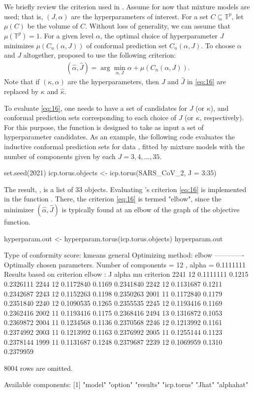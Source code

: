 We briefly review the criterion used in \citet{Jung:2021}. Assume for now that mixture models are used; that is, $(J, \alpha)$ are the hyperparameters of interest.  For a set $C\subseteq\mathbb{T}^p$, let $\mu(C)$ be the volume of $C$. Without loss of generality, we can assume that $\mu\left(\mathbb{T}^p\right)=1$. For a given level $\alpha$, the optimal choice of hyperparameter $J$ minimizes $\mu\left(C_n(\alpha,J)\right)$ of conformal prediction set $C_n\left(\alpha, J\right)$. To choose $\alpha$ and $J$ altogether, \citet{Jung:2021} proposed to use the following criterion:
\begin{align}\label{eq:16}
\left(\hat{\alpha},\hat{J}\right) = \arg\min_{\alpha, J}\alpha + \mu\left(C_n\left(\alpha, J\right)\right).
\end{align}
Note that if $(\kappa, \alpha)$ are the hyperparameters, then $J$ and $\hat{J}$ in  \eqref{eq:16} are replaced by $\kappa$ and $\hat\kappa$. 

 To evaluate \eqref{eq:16}, one needs to have a set of candidates for $J$ (or $\kappa$), and conformal prediction sets corresponding to each choice of $J$ (or $\kappa$, respectively). For this purpose, the function  is designed to take as input a set of hyperparameter candidates. As an example, the following code evaluates the inductive conformal prediction sets for data , fitted by mixture models with the number of components given by each $J = 3,4,\ldots, 35$.
  
\begin{example}
set.seed(2021)
icp.torus.objects <- icp.torus(SARS_CoV_2, J = 3:35)
\end{example} 

The result, , is a list of 33  objects. Evaluating \citet{Jung:2021}'s criterion \eqref{eq:16} is implemented in the function . There, the criterion \eqref{eq:16} is termed "elbow", since the minimizer $(\hat\alpha,\hat{J})$ is typically found at an elbow of the graph of the objective function. 

\begin{example}
hyperparam.out <- hyperparam.torus(icp.torus.objects)
hyperparam.out

Type of conformity score: kmeans general
Optimizing method: elbow
-------------
Optimally chosen parameters. Number of components =  12 , alpha =  0.1111111
Results based on criterion elbow :
      J     alpha     mu criterion
2241 12 0.1111111 0.1215 0.2326111
2244 12 0.1172840 0.1169 0.2341840
2242 12 0.1131687 0.1211 0.2342687
2243 12 0.1152263 0.1198 0.2350263
2001 11 0.1172840 0.1179 0.2351840
2240 12 0.1090535 0.1265 0.2355535
2245 12 0.1193416 0.1169 0.2362416
2002 11 0.1193416 0.1175 0.2368416
2494 13 0.1316872 0.1053 0.2369872
2004 11 0.1234568 0.1136 0.2370568
2246 12 0.1213992 0.1161 0.2374992
2003 11 0.1213992 0.1163 0.2376992
2005 11 0.1255144 0.1123 0.2378144
1999 11 0.1131687 0.1248 0.2379687
2239 12 0.1069959 0.1310 0.2379959

8004 rows are omitted.

Available components:
[1] "model"     "option"    "results"   "icp.torus" "Jhat"      "alphahat"
\end{example} 
 
